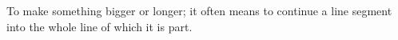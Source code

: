 To make something bigger or longer; it often means
to continue a line segment into the whole line of
which it is part.